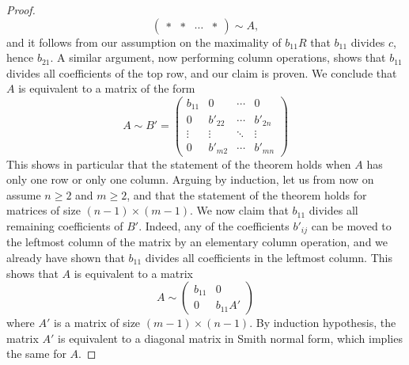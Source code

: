 \documentclass[12pt, a4paper]{article}
\begin{document}
\begin{proof}
\[\begin{pmatrix}
* & * & \cdots & *
\end{pmatrix}\sim A,
\]
and it follows from our assumption on the maximality of \( b_{11}R \) that \( b_{11} \) divides \( c \), hence \( b_{21} \). A similar argument, now performing column operations, shows that \( b_{11} \) divides all coefficients of the top row, and our claim is proven. We conclude that \( A \) is equivalent to a matrix of the form
\[
A \sim B' =
\begin{pmatrix}
b_{11} & 0 & \cdots & 0 \\
0 & b'_{22} & \cdots & b'_{2n} \\
\vdots & \vdots & \ddots & \vdots \\
0 & b'_{m2} & \cdots & b'_{mn}
\end{pmatrix}
\]
This shows in particular that the statement of the theorem holds when \( A \) has only one row or only one column. Arguing by induction, let us from now on assume \( n \geq 2 \) and \( m \geq 2 \), and that the statement of the theorem holds for matrices of size \( (n - 1) \times (m - 1) \). We now claim that \( b_{11} \) divides all remaining coefficients of \( B' \). Indeed, any of the coefficients \( b'_{ij} \) can be moved to the leftmost column of the matrix by an elementary column operation, and we already have shown that \( b_{11} \) divides all coefficients in the leftmost column. This shows that \( A \) is equivalent to a matrix
\[
A \sim 
\begin{pmatrix}
b_{11} & 0 \\
0 & b_{11}A'
\end{pmatrix}
\]
where \( A' \) is a matrix of size \( (m - 1) \times (n - 1) \). By induction hypothesis, the matrix \( A' \) is equivalent to a diagonal matrix in Smith normal form, which implies the same for \( A \).
\end{proof}
\end{document}
